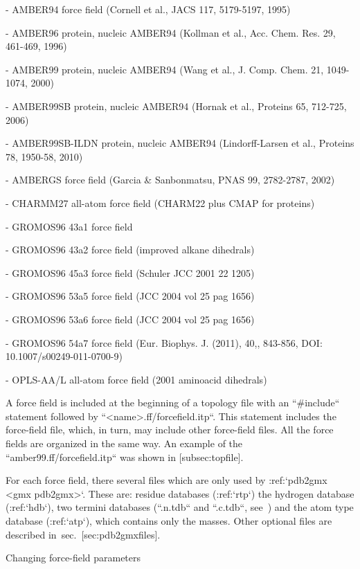 -  AMBER94 force field (Cornell et al., JACS 117, 5179-5197, 1995)

-  AMBER96 protein, nucleic AMBER94 (Kollman et al., Acc. Chem. Res. 29,
   461-469, 1996)

-  AMBER99 protein, nucleic AMBER94 (Wang et al., J. Comp. Chem. 21,
   1049-1074, 2000)

-  AMBER99SB protein, nucleic AMBER94 (Hornak et al., Proteins 65,
   712-725, 2006)

-  AMBER99SB-ILDN protein, nucleic AMBER94 (Lindorff-Larsen et al.,
   Proteins 78, 1950-58, 2010)

-  AMBERGS force field (Garcia & Sanbonmatsu, PNAS 99, 2782-2787, 2002)

-  CHARMM27 all-atom force field (CHARM22 plus CMAP for proteins)

-  GROMOS96 43a1 force field

-  GROMOS96 43a2 force field (improved alkane dihedrals)

-  GROMOS96 45a3 force field (Schuler JCC 2001 22 1205)

-  GROMOS96 53a5 force field (JCC 2004 vol 25 pag 1656)

-  GROMOS96 53a6 force field (JCC 2004 vol 25 pag 1656)

-  GROMOS96 54a7 force field (Eur. Biophys. J. (2011), 40,, 843-856,
   DOI: 10.1007/s00249-011-0700-9)

-  OPLS-AA/L all-atom force field (2001 aminoacid dihedrals)

A force field is included at the beginning of a topology file with an
``#include`` statement followed by
``<name>.ff/forcefield.itp``. This statement includes the
force-field file, which, in turn, may include other force-field files.
All the force fields are organized in the same way. An example of the
``amber99.ff/forcefield.itp`` was shown in
[subsec:topfile].

For each force field, there several files which are only used by
:ref:`pdb2gmx <gmx pdb2gmx>`. These are: residue databases
(:ref:`rtp`) the hydrogen
database (:ref:`hdb`), two
termini databases (``.n.tdb`` and ``.c.tdb``,
see ) and the atom type database
(:ref:`atp`), which
contains only the masses. Other optional files are described in sec. [sec:pdb2gmxfiles].

Changing force-field parameters
~~~~~~~~~~~~~~~~~~~~~~~~~~~~~~~

